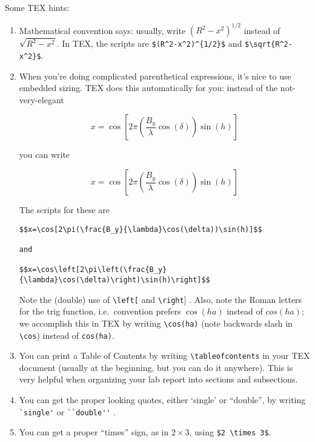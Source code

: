\documentclass[12pt,preprint]{aastex}
\begin{document}
\noindent
	Some TEX hints: \begin{enumerate}

	\item Mathematical convention says: usually, write
$(R^2-x^2)^{1/2}$ instead of $\sqrt{R^2-x^2}$.  In TEX, the scripts are
\verb&$(R^2-x^2)^{1/2}$& and \verb&$\sqrt{R^2-x^2}$&. 

	\item When you're doing complicated parenthetical expressions,
it's nice to use embedded sizing. TEX does this automatically for you:
instead of the not-very-elegant

$$x=\cos[2\pi(\frac{B_y}{\lambda}\cos(\delta))\sin(h)]$$

\noindent you can write

$$x=\cos\left[2\pi\left(\frac{B_y}{\lambda}\cos(\delta)\right)\sin(h)\right]$$

\noindent The scripts for these are

\begin{verbatim} 
$$x=\cos[2\pi(\frac{B_y}{\lambda}\cos(\delta))\sin(h)]$$

and

$$x=\cos\left[2\pi\left(\frac{B_y}{\lambda}\cos(\delta)\right)\sin(h)\right]$$
\end{verbatim}

\noindent Note the (double) use of \verb$\left[$ and \verb$\right$] . 
Also, note the Roman letters for the trig function, i.e.\ convention
prefers $\cos(ha)$ instead of $cos(ha)$; we accomplish this in TEX by
writing \verb$\cos(ha)$ (note backwards slash in \verb$\cos$) instead of
\verb$cos(ha)$. 

\item You can print a Table of Contents by writing
\verb$\tableofcontents$ in your TEX document (usually at the beginning,
but you can do it anywhere). This is very helpful when
organizing your lab report into sections and subsections.

\item You can get the proper looking quotes, either `single' or
``double'', by writing \verb$`single'$ or \verb$``double''$ . 

\item You can get a proper ``times'' sign, as in $2 \times 3$, using
\verb=$2 \times 3$=. 


\end{enumerate}
\end{document}
